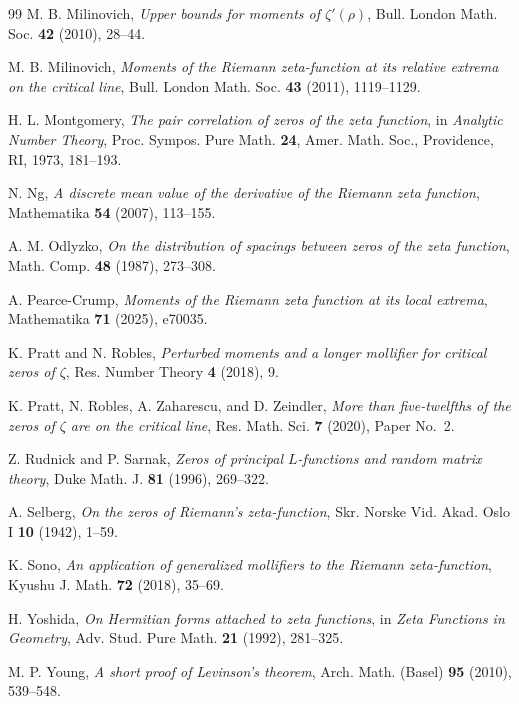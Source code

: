 \begin{thebibliography}{99}
M. B. Milinovich,
\emph{Upper bounds for moments of $\zeta'(\rho)$},
Bull. London Math. Soc. \textbf{42} (2010), 28--44.

M. B. Milinovich,
\emph{Moments of the Riemann zeta-function at its relative extrema on the critical line},
Bull. London Math. Soc. \textbf{43} (2011), 1119--1129.

H. L. Montgomery,
\emph{The pair correlation of zeros of the zeta function},
in \emph{Analytic Number Theory}, Proc. Sympos. Pure Math. \textbf{24},
Amer. Math. Soc., Providence, RI, 1973, 181--193.

N. Ng,
\emph{A discrete mean value of the derivative of the Riemann zeta function},
Mathematika \textbf{54} (2007), 113--155.

A. M. Odlyzko,
\emph{On the distribution of spacings between zeros of the zeta function},
Math. Comp. \textbf{48} (1987), 273--308.

A. Pearce-Crump,
\emph{Moments of the Riemann zeta function at its local extrema},
Mathematika \textbf{71} (2025), e70035.

K. Pratt and N. Robles,
\emph{Perturbed moments and a longer mollifier for critical zeros of $\zeta$},
Res. Number Theory \textbf{4} (2018), 9.

K. Pratt, N. Robles, A. Zaharescu, and D. Zeindler,
\emph{More than five-twelfths of the zeros of $\zeta$ are on the critical line},
Res. Math. Sci. \textbf{7} (2020), Paper No.~2.

Z. Rudnick and P. Sarnak,
\emph{Zeros of principal $L$-functions and random matrix theory},
Duke Math. J. \textbf{81} (1996), 269--322.

A. Selberg,
\emph{On the zeros of Riemann's zeta-function},
Skr. Norske Vid. Akad. Oslo I \textbf{10} (1942), 1--59.

K. Sono,
\emph{An application of generalized mollifiers to the Riemann zeta-function},
Kyushu J. Math. \textbf{72} (2018), 35--69.


H. Yoshida,
\emph{On Hermitian forms attached to zeta functions},
in \emph{Zeta Functions in Geometry},
Adv. Stud. Pure Math. \textbf{21} (1992), 281--325.

M. P. Young,
\emph{A short proof of Levinson's theorem},
Arch. Math. (Basel) \textbf{95} (2010), 539--548.

\end{thebibliography}
